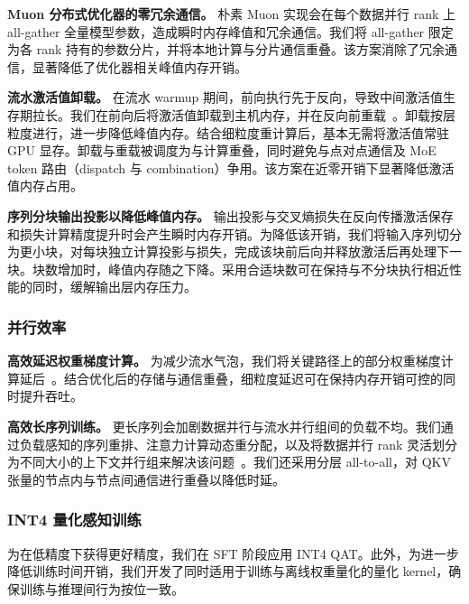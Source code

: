 \textbf{Muon 分布式优化器的零冗余通信。} 朴素 Muon 实现会在每个数据并行 rank 上 all-gather 全量模型参数，造成瞬时内存峰值和冗余通信。我们将 all-gather 限定为各 rank 持有的参数分片，并将本地计算与分片通信重叠。该方案消除了冗余通信，显著降低了优化器相关峰值内存开销。

\textbf{流水激活值卸载。} 在流水 warmup 期间，前向执行先于反向，导致中间激活值生存期拉长。我们在前向后将激活值卸载到主机内存，并在反向前重载~\cite{298555}。卸载按层粒度进行，进一步降低峰值内存。结合细粒度重计算后，基本无需将激活值常驻 GPU 显存。卸载与重载被调度为与计算重叠，同时避免与点对点通信及 MoE token 路由（dispatch 与 combination）争用。该方案在近零开销下显著降低激活值内存占用。

\textbf{序列分块输出投影以降低峰值内存。} 
输出投影与交叉熵损失在反向传播激活保存和损失计算精度提升时会产生瞬时内存开销。为降低该开销，我们将输入序列切分为更小块，对每块独立计算投影与损失，完成该块前后向并释放激活后再处理下一块。块数增加时，峰值内存随之下降。采用合适块数可在保持与不分块执行相近性能的同时，缓解输出层内存压力。


\subsubsection{并行效率}

\textbf{高效延迟权重梯度计算。} 为减少流水气泡，我们将关键路径上的部分权重梯度计算延后~\cite{qi2023zero}。结合优化后的存储与通信重叠，细粒度延迟可在保持内存开销可控的同时提升吞吐。

\textbf{高效长序列训练。} 更长序列会加剧数据并行与流水并行组间的负载不均。我们通过负载感知的序列重排、注意力计算动态重分配，以及将数据并行 rank 灵活划分为不同大小的上下文并行组来解决该问题~\cite{ge2025bytescale,wang2025flexsp}。我们还采用分层 all-to-all，对 QKV 张量的节点内与节点间通信进行重叠以降低时延。

\subsubsection{INT4 量化感知训练}

为在低精度下获得更好精度，我们在 SFT 阶段应用 INT4 QAT。此外，为进一步降低训练时间开销，我们开发了同时适用于训练与离线权重量化的量化 kernel，确保训练与推理间行为按位一致。
